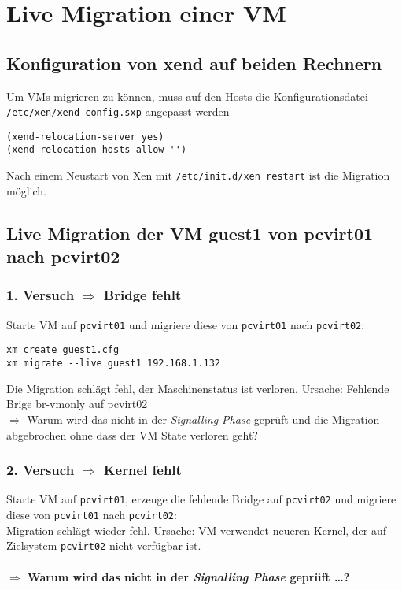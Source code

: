 \chapter{Live Migration einer VM}

\section{Konfiguration von xend auf beiden Rechnern}
Um VMs migrieren zu können, muss auf den Hosts die Konfigurationsdatei \verb#/etc/xen/xend-config.sxp# angepasst werden
\setupVerbatimOut
\begin{verbatim}
(xend-relocation-server yes)
(xend-relocation-hosts-allow '')
\end{verbatim} 
Nach einem Neustart von Xen mit \verb#/etc/init.d/xen restart# ist die Migration möglich. 

\section{Live Migration der VM guest1 von pcvirt01 nach pcvirt02}
\subsection{1. Versuch $\Rightarrow$ Bridge fehlt}
Starte VM auf \verb#pcvirt01# und migriere diese von \verb#pcvirt01# nach \verb#pcvirt02#:
\setupVerbatimOut
\begin{verbatim}
xm create guest1.cfg
xm migrate --live guest1 192.168.1.132
\end{verbatim}

Die Migration schlägt fehl, der Maschinenstatus ist verloren. Ursache: Fehlende Brige br-vmonly auf pcvirt02
\\
$\Rightarrow$ Warum wird das nicht in der \emph{Signalling Phase} geprüft und die Migration abgebrochen ohne dass der VM State verloren geht? 

\subsection {2. Versuch $\Rightarrow$ Kernel fehlt}
Starte VM auf \verb#pcvirt01#, erzeuge die fehlende Bridge auf \verb#pcvirt02# und migriere diese von \verb#pcvirt01# nach \verb#pcvirt02#:
\\
Migration schlägt wieder fehl. Ursache: VM verwendet neueren Kernel, der auf Zielsystem \verb#pcvirt02# nicht verfügbar ist.
\\
\\
\large
\textbf{$\Rightarrow$ Warum wird das nicht in der \emph{Signalling Phase} geprüft \dots?}
\normalsize

